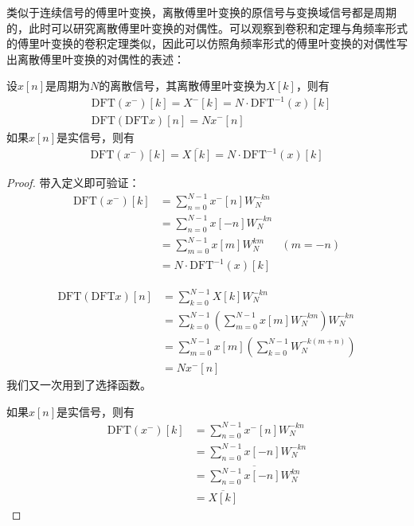 类似于连续信号的傅里叶变换，离散傅里叶变换的原信号与变换域信号都是周期的，此时可以研究离散傅里叶变换的对偶性。可以观察到卷积和定理与角频率形式的傅里叶变换的卷积定理类似，因此可以仿照角频率形式的傅里叶变换的对偶性写出离散傅里叶变换的对偶性的表述：
\begin{proposition}[离散傅里叶变换的对偶性]
    设$x[n]$是周期为$N$的离散信号，其离散傅里叶变换为$X[k]$，则有
    \begin{align*}
        &\text{DFT}(x^-)[k]=X^-[k]=N\cdot\text{DFT}^{-1}(x)[k]\\
        &\text{DFT}\left(\text{DFT}x\right)[n]=N x^- [n]
    \end{align*}
    如果$x[n]$是实信号，则有
    \begin{align*}
        \text{DFT}(x^-)[k]=\overline{X[k]}=N\cdot\text{DFT}^{-1}(x)[k]
    \end{align*}
\end{proposition}
\begin{proof}
    带入定义即可验证：
    \begin{align*}
        \text{DFT}(x^-)[k]&=\sum_{n=0}^{N-1}x^- [n]W_N^{-kn}\\
        &=\sum_{n=0}^{N-1}x[-n]W_N^{-kn}\\
        &=\sum_{m=0}^{N-1}x[m]W_N^{km}&(m=-n)\\
        &=N\cdot\text{DFT}^{-1}(x)[k]
    \end{align*}

    \begin{align*}
        \text{DFT}\left(\text{DFT}x\right)[n]&=\sum_{k=0}^{N-1}X[k]W_N^{-kn}\\
        &=\sum_{k=0}^{N-1}\left(\sum_{m=0}^{N-1}x[m]W_N^{-km}\right)W_N^{-kn}\\
        &=\sum_{m=0}^{N-1}x[m]\left(\sum_{k=0}^{N-1}W_N^{-k(m+n)}\right)\\
        &=N x^- [n]
    \end{align*}
    我们又一次用到了选择函数。

    如果$x[n]$是实信号，则有
    \begin{align*}
        \text{DFT}(x^-)[k]&=\sum_{n=0}^{N-1}x^- [n]W_N^{-kn}\\
        &=\sum_{n=0}^{N-1}x[-n]W_N^{-kn}\\
        &=\overline{\sum_{n=0}^{N-1}x[-n]W_N^{kn}}\\
        &=\overline{X[k]}
    \end{align*}
\end{proof}

